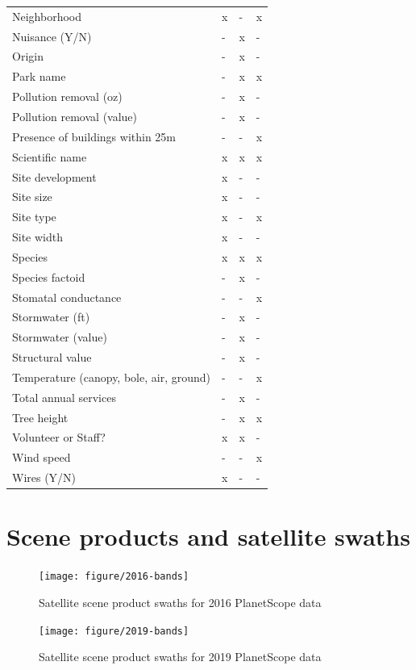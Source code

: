 \documentclass[12pt,twoside]{reedthesis}
\begin{document}
\begin{longtable}[t]{llll}
Neighborhood & x & - & x\\
Nuisance (Y/N) & - & x & -\\
\addlinespace
Origin & - & x & -\\
Park name & - & x & x\\
Pollution removal (oz) & - & x & -\\
Pollution removal (value) & - & x & -\\
Presence of buildings within 25m & - & - & x\\
\addlinespace
Scientific name & x & x & x\\
Site development & x & - & -\\
Site size & x & - & -\\
Site type & x & - & x\\
Site width & x & - & -\\
\addlinespace
Species & x & x & x\\
Species factoid & - & x & -\\
Stomatal conductance & - & - & x\\
Stormwater (ft) & - & x & -\\
Stormwater (value) & - & x & -\\
\addlinespace
Structural value & - & x & -\\
Temperature (canopy, bole, air, ground) & - & - & x\\
Total annual services & - & x & -\\
Tree height & - & x & x\\
Volunteer or Staff? & x & x & -\\
\addlinespace
Wind speed & - & - & x\\
Wires (Y/N) & x & - & -\\
\bottomrule
\end{longtable}
\hypertarget{scene-products-and-satellite-swaths}{%
\section{Scene products and satellite swaths}\label{scene-products-and-satellite-swaths}}
\begin{figure}

{\centering \texttt{[image: figure/2016-bands]} 

}

\caption{Satellite scene product swaths for 2016 PlanetScope data}\label{fig:2016-swath}
\end{figure}
\begin{figure}

{\centering \texttt{[image: figure/2019-bands]} 

}

\caption{Satellite scene product swaths for 2019 PlanetScope data}\label{fig:2019-swath}
\end{figure}
\end{document}

